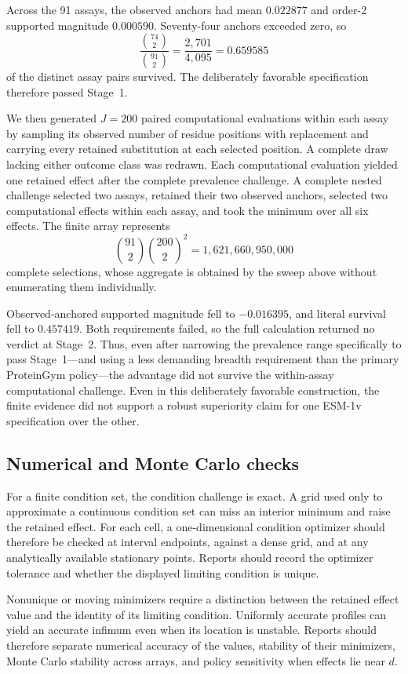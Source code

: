 \documentclass[11pt]{article}
\theoremstyle{remark}
\begin{document}
Across the 91 assays, the observed anchors had mean $0.022877$ and order-2
supported magnitude $0.000590$. Seventy-four anchors exceeded zero, so
\[
\frac{\binom{74}{2}}{\binom{91}{2}}
=
\frac{2{,}701}{4{,}095}
=
0.659585
\]
of the distinct assay pairs survived. The deliberately favorable
specification therefore passed Stage~1.

We then generated $J=200$ paired computational evaluations within each assay
by sampling its observed number of residue positions with replacement and
carrying every retained substitution at each selected position. A complete
draw lacking either outcome class was redrawn. Each computational evaluation
yielded one retained effect after the complete prevalence challenge. A
complete nested challenge selected two assays, retained their two observed
anchors, selected two computational effects within each assay, and took the
minimum over all six effects. The finite array represents
\[
\binom{91}{2}\binom{200}{2}^{2}
=1{,}621{,}660{,}950{,}000
\]
complete selections, whose aggregate is obtained by the sweep above without
enumerating them individually.

Observed-anchored supported magnitude fell to $-0.016395$, and literal
survival fell to $0.457419$. Both requirements failed, so the full calculation
returned no verdict at Stage~2. Thus, even after narrowing the prevalence
range specifically to pass Stage~1---and using a less demanding breadth
requirement than the primary ProteinGym policy---the advantage did not survive
the within-assay computational challenge. Even in this deliberately favorable
construction, the finite evidence did not support a robust superiority claim
for one ESM-1v specification over the other.

\subsection{Numerical and Monte Carlo checks}

For a finite condition set, the condition challenge is exact. A grid used only
to approximate a continuous condition set can miss an interior minimum and
raise the retained effect. For each cell, a one-dimensional condition optimizer
should therefore be checked at interval endpoints, against a dense grid, and
at any analytically available stationary points. Reports should record the
optimizer tolerance and whether the displayed limiting condition is unique.

Nonunique or moving minimizers require a distinction between the retained
effect value and the identity of its limiting condition. Uniformly accurate
profiles can yield an accurate infimum even when its location is unstable.
Reports should therefore separate numerical accuracy of the values, stability
of their minimizers, Monte Carlo stability across arrays, and policy
sensitivity when effects lie near $d$.
\end{document}
